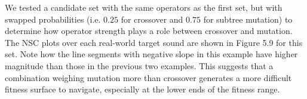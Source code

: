 \documentclass[12pt]{report} 	%
\numberwithin{figure}{chapter}
\numberwithin{table}{chapter}
\numberwithin{equation}{chapter}
\begin{document}
\begin{flushleft}
We tested a candidate set with the same operators as the first set, but with swapped probabilities (i.e. $0.25$ for crossover and $0.75$ for subtree mutation) to determine how operator strength plays a role between crossover and mutation. The NSC plots over each real-world target sound are shown in Figure 5.9 for this set.
Note how the line segments with negative slope in this example have higher magnitude than those in the previous two examples. This suggests that a combination weighing mutation more than crossover generates a more difficult fitness surface to navigate, especially at the lower ends of the fitness range.


\end{flushleft}
\end{document}
